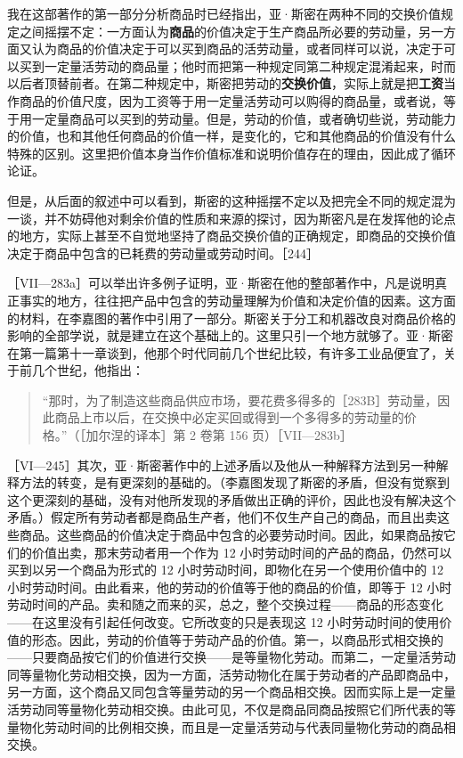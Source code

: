 我在这部著作的第一部分分析商品时已经指出，亚·斯密在两种不同的交换价值规定之间摇摆不定：一方面认为\textbf{商品}的价值决定于生产商品所必要的劳动量，另一方面又认为商品的价值决定于可以买到商品的活劳动量，或者同样可以说，决定于可以买到一定量活劳动的商品量；他时而把第一种规定同第二种规定混淆起来，时而以后者顶替前者。在第二种规定中，斯密把劳动的\textbf{交换价值}，实际上就是把\textbf{工资}当作商品的价值尺度，因为工资等于用一定量活劳动可以购得的商品量，或者说，等于用一定量商品可以买到的劳动量。但是，劳动的价值，或者确切些说，劳动能力的价值，也和其他任何商品的价值一样，是变化的，它和其他商品的价值没有什么特殊的区别。这里把价值本身当作价值标准和说明价值存在的理由，因此成了循环论证。

但是，从后面的叙述中可以看到，斯密的这种摇摆不定以及把完全不同的规定混为一谈，并不妨碍他对剩余价值的性质和来源的探讨，因为斯密凡是在发挥他的论点的地方，实际上甚至不自觉地坚持了商品交换价值的正确规定，即商品的交换价值决定于商品中包含的已耗费的劳动量或劳动时间。［244］

［VII—283a］\fontbox{~\{}可以举出许多例子证明，亚·斯密在他的整部著作中，凡是说明真正事实的地方，往往把产品中包含的劳动量理解为价值和决定价值的因素。这方面的材料，在李嘉图的著作中引用了一部分。斯密关于分工和机器改良对商品价格的影响的全部学说，就是建立在这个基础上的。这里只引一个地方就够了。亚·斯密在第一篇第十一章谈到，他那个时代同前几个世纪比较，有许多工业品便宜了，关于前几个世纪，他指出：

\begin{quote}“那时，为了制造这些商品供应市场，要花费多得多的［283B］劳动量，因此商品上市以后，在交换中必定买回或得到一个多得多的劳动量的价格。”（［加尔涅的译本］第 2 卷第 156 页）\fontbox{\}~}［VII—283b］\end{quote}

［VI—245］其次，亚·斯密著作中的上述矛盾以及他从一种解释方法到另一种解释方法的转变，是有更深刻的基础的。（李嘉图发现了斯密的矛盾，但没有觉察到这个更深刻的基础，没有对他所发现的矛盾做出正确的评价，因此也没有解决这个矛盾。）假定所有劳动者都是商品生产者，他们不仅生产自己的商品，而且出卖这些商品。这些商品的价值决定于商品中包含的必要劳动时间。因此，如果商品按它们的价值出卖，那末劳动者用一个作为 12 小时劳动时间的产品的商品，仍然可以买到以另一个商品为形式的 12 小时劳动时间，即物化在另一个使用价值中的 12 小时劳动时间。由此看来，他的劳动的价值等于他的商品的价值，即等于 12 小时劳动时间的产品。卖和随之而来的买，总之，整个交换过程——商品的形态变化——在这里没有引起任何改变。它所改变的只是表现这 12 小时劳动时间的使用价值的形态。因此，劳动的价值等于劳动产品的价值。第一，以商品形式相交换的——只要商品按它们的价值进行交换——是等量物化劳动。而第二，一定量活劳动同等量物化劳动相交换，因为一方面，活劳动物化在属于劳动者的产品即商品中，另一方面，这个商品又同包含等量劳动的另一个商品相交换。因而实际上是一定量活劳动同等量物化劳动相交换。由此可见，不仅是商品同商品按照它们所代表的等量物化劳动时间的比例相交换，而且是一定量活劳动与代表同量物化劳动的商品相交换。

